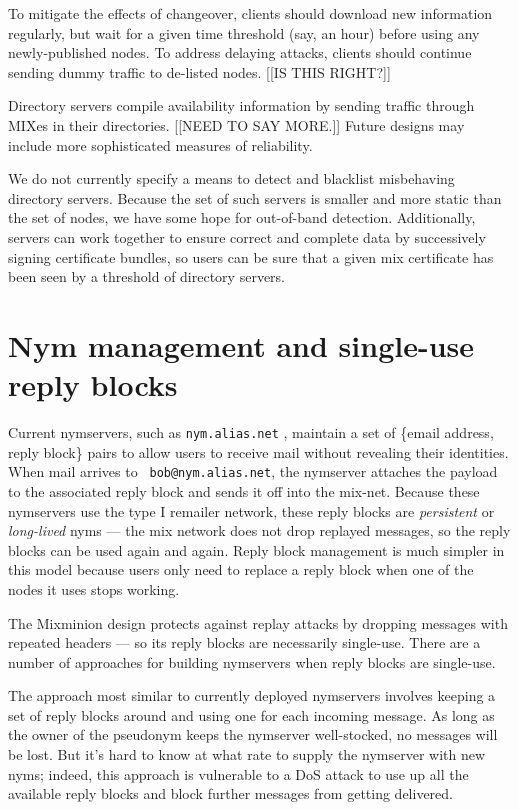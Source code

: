 \documentclass{llncs}
\begin{document}
To mitigate the effects of changeover, clients should download new
information regularly, but wait for a given time threshold (say, an
hour) before using any newly-published nodes.  To address delaying
attacks, clients should continue sending dummy traffic to de-listed
nodes. [[IS THIS RIGHT?]]

Directory servers compile availability information by sending traffic
through MIXes in their directories. [[NEED TO SAY MORE.]] Future
designs may include more sophisticated measures of reliability.

We do not currently specify a means to detect and blacklist
misbehaving directory servers.  Because the set of such servers is
smaller and more static than the set of nodes, we have some hope for
out-of-band detection.  Additionally, servers can work together to
ensure correct and complete data by successively signing certificate
bundles, so users can be sure that a given mix certificate has been
seen by a threshold of directory servers.




\section{Nym management and single-use reply blocks}
\label{sec:nymservers}

Current nymservers, such as {\tt nym.alias.net} \cite{nym-alias-net},
maintain a set of \{email address, reply block\} pairs to allow users to
receive mail without revealing their identities. When mail arrives to {\tt
bob@nym.alias.net}, the nymserver attaches the payload to the associated
reply block and sends it off into the mix-net. Because these nymservers
use the type I remailer network, these reply blocks are \emph{persistent}
or \emph{long-lived} nyms --- the mix network does not drop replayed
messages, so the reply blocks can be used again and again. Reply block
management is much simpler in this model because users only need to
replace a reply block when one of the nodes it uses stops working.

The Mixminion design protects against replay attacks by dropping
messages with repeated headers --- so its reply blocks are necessarily
single-use. There are a number of approaches for building nymservers
when reply blocks are single-use.

The approach most similar to currently deployed nymservers involves
keeping a set of reply blocks around and using one for each incoming
message. As long as the owner of the pseudonym keeps the nymserver
well-stocked, no messages will be lost. But it's hard to know at what
rate to supply the nymserver with new nyms; indeed, this approach is
vulnerable to a DoS attack to use up all the available reply blocks and
block further messages from getting delivered.
\end{document}
